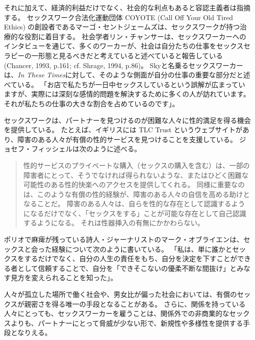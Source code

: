 \documentclass[paper=a4,book,openany]{jlreq}
\newcommand{\ig}[1]{}           %
\begin{document}
それに加えて、経済的利益だけでなく、社会的な利点もあると容認主義者は指摘する。
セックスワーク合法化運動団体 COYOTE (Call Off Your Old Tired Ethics) の創設者であるマーゴ・セントジェームズは、セックスワークが持つ治療的な役割に着目する。
社会学者リン・チャンサーは、セックスワーカーへのインタビューを通じて、多くのワーカーが、社会は自分たちの仕事をセックスセラピーの一形態と見るべきだと考えていると述べていると報告している(Chancer, 1993, p.161; cf. Shrage, 1994, p.86)。
\nocite{chancer93:_prost_femin_theor_ambiv}\nocite{shrage93:_moral_dilem_femin}
Skyと名乗るセックスワーカーは、\emph{In These Times}に対して、そのような側面が自分の仕事の重要な部分だと述べている。
「お店で私たちが一日中セックスしているという誤解が広まっていますが、実際には深刻な感情的問題を解決するために多くの人が訪れています。
それが私たちの仕事の大きな割合を占めているのです」\citep{weisman18:_when_sex_worker_do_labor_therap}。

セックスワークは、パートナーを見つけるのが困難な人々に性的満足を得る機会を提供している。
たとえば、イギリスには TLC Trust というウェブサイトがあり、障害のある人々が有償の性的サービスを見つけることを支援している\ig{\footnote{\url{http://tlc-trust.org.uk/}.}}。
ジョセフ・フィッシェルは次のように述べる。

\begin{quote}

性的サービスのプライベートな購入（セックスの購入を含む）は、一部の障害者にとって、そうでなければ得られないような、またはひどく困難な可能性のある性的快楽へのアクセスを提供してくれる。
同様に重要なのは、このような有償の性的経験が、障害のある人々の自信を高める助けとなることだ。
障害のある人々は、自らを性的な存在として認識するようになるだけでなく、「セックスをする」ことが可能な存在として自己認識するようになる。
それは性器挿入の有無にかかわらない。
\citep[p.220]{fischel18:screwconsent}
\end{quote}

ポリオで麻痺が残っている詩人・ジャーナリストのマーク・オブライエンは、セックスと会った経験について次のように書いている。
「私は、単に誰かとセックスをするだけでなく、自分の人生の責任をもち、自分を決定を下すことができる者として信頼することで、自分を「できそこないの優柔不断な間抜け」とみなす見方を変えられることを知った」\citep{obrien90:_seein_sex_surrog}。

人々が孤立した場所で働く社会や、男女比が偏った社会においては、有償のセックスが親密さを得る唯一の手段となることがある。
さらに、関係を持っている人々にとっても、セックスワーカーを雇うことは、関係外での非商業的なセックスよりも、パートナーにとって脅威が少ない形で、新規性や多様性を提供する手段となりえる\citep{mesko12:_effec_prost_stabil_roman_relat}。
\end{document}
